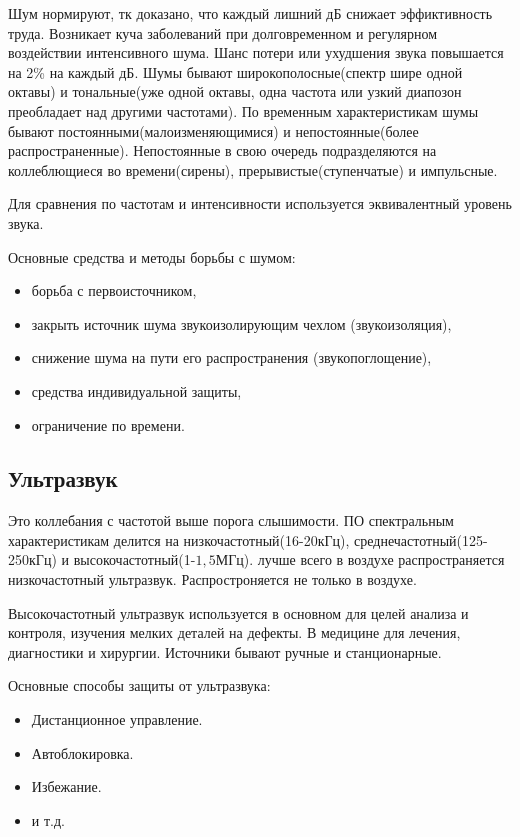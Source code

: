 Шум нормируют, тк доказано, что каждый лишний дБ снижает эффиктивность труда. Возникает куча заболеваний при долговременном и регулярном воздействии интенсивного шума. Шанс потери или ухудшения звука повышается на 2\% на каждый дБ. Шумы бывают широкополосные(спектр шире одной октавы) и тональные(уже одной октавы, одна частота или узкий диапозон преобладает над другими частотами). По временным характеристикам шумы бывают постоянными(малоизменяющимися) и непостоянные(более распространенные). Непостоянные в свою очередь подразделяются на коллеблющиеся во времени(сирены), прерывистые(ступенчатые) и импульсные. 

Для сравнения по частотам и интенсивности используется эквивалентный уровень звука.

Основные средства и методы борьбы с шумом:
\begin{itemize}
	\item борьба с первоисточником,
	\item закрыть источник шума звукоизолирующим чехлом (звукоизоляция),
	\item снижение шума на пути его распространения (звукопоглощение),
	\item средства индивидуальной защиты,
	\item ограничение по времени.
\end{itemize}

\subsection{Ультразвук}
Это коллебания с частотой выше порога слышимости. ПО спектральным характеристикам делится на низкочастотный(16-20кГц), среднечастотный(125-250кГц) и высокочастотный(1-$1{,}5$МГц). лучше всего в воздухе распространяется низкочастотный ультразвук. Распростроняется не только в воздухе. 

Высокочастотный ультразвук используется в основном для целей анализа и контроля, изучения мелких деталей на дефекты. В медицине для лечения, диагностики и хирургии. Источники бывают ручные и станционарные.

Основные способы защиты от ультразвука:
\begin{itemize}
	\item Дистанционное управление.
	\item Автоблокировка.
	\item Избежание.
	\item и т.д.
\end{itemize}

